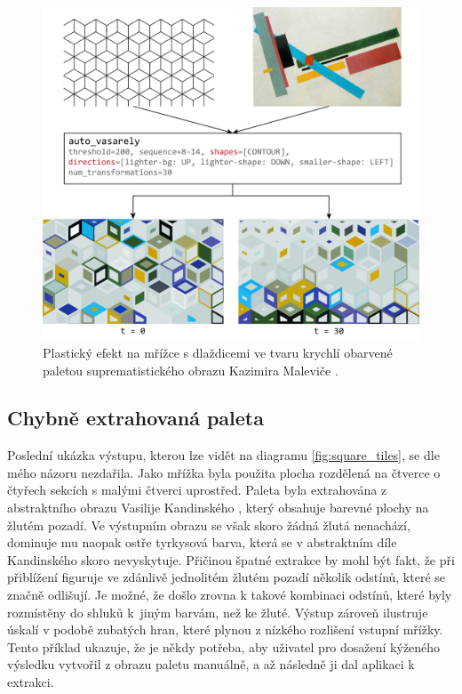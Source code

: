 \begin{figure}
    \centering
    \includegraphics[width=\textwidth]{obrazky-figures/cubes.pdf}
    \caption{Plastický efekt na mřížce s dlaždicemi ve tvaru krychlí obarvené paletou suprematistického obrazu Kazimira Maleviče \cite{suprematism}. }
    \label{fig:cubes}
\end{figure}

\subsection*{Chybně extrahovaná paleta}

Poslední ukázka výstupu, kterou lze vidět na diagramu \ref{fig:square_tiles}, se dle mého názoru nezdařila. Jako mřížka byla použita plocha rozdělená na čtverce o čtyřech sekcích s malými čtverci uprostřed. Paleta byla extrahována z abstraktního obrazu Vasilije Kandinského \cite{yellow}, který obsahuje barevné plochy na žlutém pozadí. Ve výstupním obrazu se však skoro žádná žlutá nenachází, dominuje mu naopak ostře tyrkysová barva, která se v abstraktním díle Kandinského skoro nevyskytuje. Přičinou špatné extrakce by mohl být fakt, že při přiblížení figuruje ve zdánlivě jednolitém žlutém pozadí několik odstínů, které se značně odlišují. Je možné, že došlo zrovna k takové kombinaci odstínů, které byly rozmístěny do shluků k~jiným barvám, než ke žluté. Výstup zároveň ilustruje úskalí v podobě zubatých hran, které plynou z nízkého rozlišení vstupní mřížky. Tento příklad ukazuje, že je někdy potřeba, aby uživatel pro dosažení kýženého výsledku vytvořil z obrazu paletu manuálně, a až následně ji dal aplikaci k extrakci.

